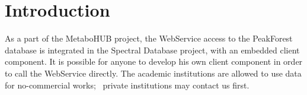 


\usepackage{hyperref}



\newcommand{\specialcell}[2][c]{%
  \begin{tabular}[#1]{@{}c@{}}#2\end{tabular}}










%

\section{Introduction}
\hspace*{\parindent}
As a part of the MetaboHUB project, 
the WebService access to the PeakForest database is integrated in the Spectral Database project, 
with an embedded client component. 
It is possible for anyone to develop his own client component in order to call the WebService directly. 
\newline
\hspace*{\parindent}
The academic institutions are allowed to use data for no-commercial works;~
private institutions may contact us first.

